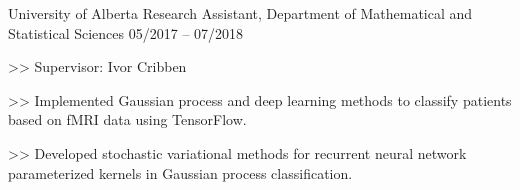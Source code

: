 \begin{cventries}
  \cventry
    {University of Alberta}
    {Research Assistant, Department of Mathematical and Statistical Sciences}    {05/2017 -- 07/2018}
    {
      \begin{cvitems}
        \item[>>] Supervisor: Ivor Cribben
        \item[>>] Implemented Gaussian process and deep learning methods to classify patients based on fMRI data using TensorFlow.
        \item[>>] Developed stochastic variational methods for recurrent neural network parameterized kernels in Gaussian process classification.
      \end{cvitems}
    }

\end{cventries}
